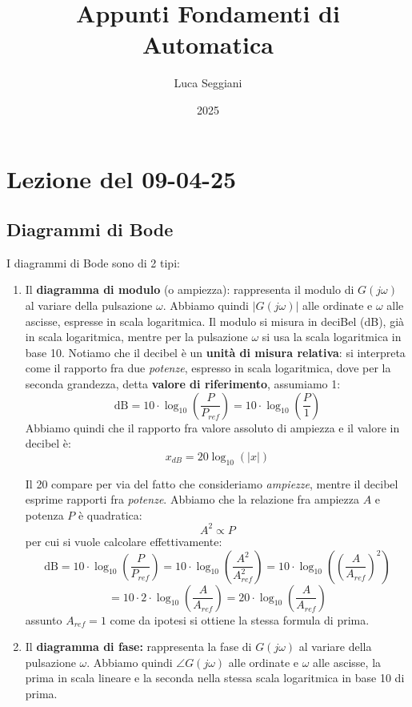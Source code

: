 \documentclass[a4paper,11pt]{article}
\title{Appunti Fondamenti di Automatica}
\author{Luca Seggiani}
\date{2025}
\begin{document}
\section{Lezione del 09-04-25}

\thispagestyle{empty}
\pagestyle{fancy}

\subsection{Diagrammi di Bode}
I diagrammi di Bode sono di 2 tipi:
\begin{enumerate}
	\item Il \textbf{diagramma di modulo} (o ampiezza): rappresenta il modulo di $G(j\omega)$ al variare della pulsazione $\omega$.
		Abbiamo quindi $|G(j \omega)|$ alle ordinate e $\omega$ alle ascisse, espresse in scala logaritmica.
		Il modulo si misura in deciBel (dB), già in scala logaritmica, mentre per la pulsazione $\omega$ si usa la scala logaritmica in base 10.
		Notiamo che il decibel è un \textbf{unità di misura relativa}: si interpreta come il rapporto fra due \textit{potenze}, espresso in scala logaritmica, dove per la seconda grandezza, detta \textbf{valore di riferimento}, assumiamo 1:
		$$
		\mathrm{dB} = 10 \cdot \log_{10} \left( \frac{P}{P_{ref}} \right) =  10 \cdot \log_{10} \left( \frac{P}{1} \right)
		$$
		Abbiamo quindi che il rapporto fra valore assoluto di ampiezza e il valore in decibel è:
		$$
		x_{dB} = 20 \log_{10}(|x|)
		$$

		Il 20 compare per via del fatto che consideriamo \textit{ampiezze}, mentre il decibel esprime rapporti fra \textit{potenze}.
	Abbiamo che la relazione fra ampiezza $A$ e potenza $P$ è quadratica:
	$$
	A^2 \propto P
	$$
	per cui si vuole calcolare effettivamente:
	$$
	\mathrm{dB} = 10 \cdot \log_{10} \left( \frac{P}{P_{ref}} \right) = 10 \cdot \log_{10} \left( \frac{A^2}{A_{ref}^2} \right) = 10 \cdot \log_{10} \left( \left( \frac{A}{A_{ref}} \right)^2 \right)
	$$
	$$
	= 10 \cdot 2 \cdot \log_{10} \left( \frac{A}{A_{ref}} \right) = 20 \cdot \log_{10} \left( \frac{A}{A_{ref}} \right)
	$$
	assunto $A_{ref} = 1$ come da ipotesi si ottiene la stessa formula di prima.

	\item Il \textbf{diagramma di fase:} rappresenta la fase di $G(j\omega)$ al variare della pulsazione $\omega$.
		Abbiamo quindi $\angle G(j \omega)$ alle ordinate e $\omega$ alle ascisse, la prima in scala lineare e la seconda nella stessa scala logaritmica in base 10 di prima.
\end{enumerate}
\end{document}
